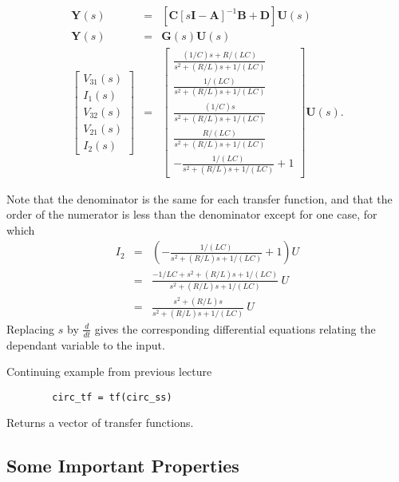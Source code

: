\begin{slide}
  \label{slide:l2final}
\begin{eqnarray*}
\mathbf{Y}(s)&=&\left[\mathbf{C}\left[s\mathbf{I}-\mathbf{A}\right]^{-1}\mathbf{B}+\mathbf{D}\right]\mathbf{U}(s)\\
\mathbf{Y}(s) &=& \mathbf{G}(s)\mathbf{U}(s)\\
\left[\begin{array}{c}
  V_{31}(s) \\
  I_1(s) \\
  V_{32}(s) \\
  V_{21}(s) \\
  I_{2}(s)
\end{array}\right] &=& \left[\begin{array}{c}
  \frac{(1/C)s+R/(LC)}{s^2 + (R/L)s
+1/(LC)} \\
  \frac{1/(LC)}{s^2 + (R/L)s
+1/(LC)} \\
  \frac{(1/C)s}{s^2 + (R/L)s
+1/(LC)} \\
  \frac{R/(LC)}{s^2 + (R/L)s
+1/(LC)} \\
  -\frac{1/(LC)}{s^2 + (R/L)s
+1/(LC)}+1
\end{array}\right]\mathbf{U}(s).
\end{eqnarray*}
\end{slide}
Note that the denominator is the same for each transfer function,
and that the order of the numerator is less than the denominator
except for one case, for which
\begin{eqnarray*}
I_2 & = & \left(-\frac{1/(LC)}{s^2 + (R/L)s +1/(LC)}+1\right)U\\
    & = & \frac{-1/{LC}+s^2 + (R/L)s +1/(LC)}{s^2 + (R/L)s
    +1/(LC)}\ U
    \\
    & = &\frac{s^2 + (R/L)s}{s^2 + (R/L)s
    +1/(LC)}\ U
\end{eqnarray*}
Replacing $s$ by $\frac{d}{dt}$ gives the corresponding
differential equations relating the dependant variable to the
input.

\begin{slide}
	Continuing example from previous lecture
	\begin{verbatim}
		circ_tf = tf(circ_ss)
	\end{verbatim}
	Returns a vector of transfer functions.
\end{slide}

\subsection*{Some Important Properties}

